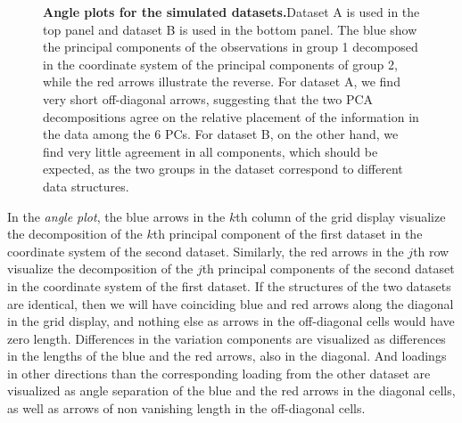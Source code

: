 \documentclass[a4paper,14pt]{article}
\begin{document}
\begin{figure}[!h]
\caption{{\bf Angle plots for the simulated datasets.}Dataset A is used in the top panel and dataset B is used in the bottom panel. The blue show the principal components of the observations in group 1 decomposed in the coordinate system of the principal components of group 2, while the red arrows illustrate the reverse. For dataset A, we find very short off-diagonal arrows, suggesting that the two PCA decompositions agree on the relative placement of the information in  the data among the 6 PCs.  For dataset B, on the other hand, we find very little agreement in all components, which should be expected, as the two groups in the dataset correspond to different data structures.}
\label{plot.simAngle}
\end{figure}

In the \emph{angle plot}, the blue arrows in the $k$th column of the grid display visualize the decomposition of the $k$th principal component of the first dataset in the coordinate system of the second dataset. Similarly, the red arrows in the $j$th row visualize the decomposition of the $j$th principal components of the second dataset in the coordinate system of the first dataset. If the structures of the two datasets are identical, then we will have coinciding blue and red arrows along the diagonal in the grid display, and nothing else as arrows in the off-diagonal cells would have zero length. Differences in the variation components are visualized as differences in the lengths of the blue and the red arrows, also in the diagonal. And loadings in other directions than the corresponding loading from the other dataset are visualized as angle separation of the blue and the red arrows in the diagonal cells, as well as arrows of non vanishing length in the off-diagonal cells.
\end{document}
